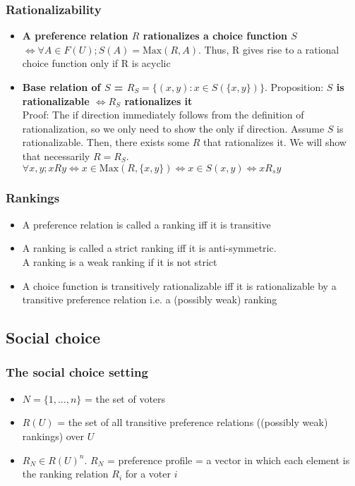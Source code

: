 \documentclass[20pt,a4paper,landscape]{extarticle}
\begin{document}
\begin{flushleft}
\subsubsection{Rationalizability}
\begin{itemize}
\item{\textbf{A preference relation $R$ rationalizes a choice function $S$ $\Leftrightarrow \forall A \in F(U); S(A) = \textrm{Max}(R, A)$}. Thus, R gives rise to a rational choice function only if R is acyclic}
\item{\textbf{Base relation of $S$ = $R_S = \{(x, y): x \in S(\{x, y\})\}$}. Proposition: \textbf{$S$ is rationalizable $\Leftrightarrow R_S$ rationalizes it}\\
Proof: The if direction immediately follows from the definition of rationalization, so we only need to show the only if direction. Assume $S$ is rationalizable. Then, there exists some $R$ that rationalizes it. We will show that necessarily $R = R_S$. $\forall x, y; xRy \Leftrightarrow x \in \textrm{Max}(R, \{x, y\}) \Leftrightarrow x \in S({x, y}) \Leftrightarrow xR_sy$}
\end{itemize}
\clearpage
\subsubsection{Rankings}
\begin{itemize}
\item A preference relation is called a ranking iff it is transitive
\item A ranking is called a strict ranking iff it is anti-symmetric.\\
A ranking is a weak ranking if it is not strict
\item A choice function is transitively rationalizable iff it is rationalizable by a transitive preference relation i.e. a (possibly weak) ranking
\end{itemize}
\clearpage
\subsection{Social choice}
\subsubsection{The social choice setting}
\begin{itemize}
\item $N = \{1, ..., n\}$ = the set of voters
\item $R(U)$ = the set of all transitive preference relations ((possibly weak) rankings) over $U$
\item{$R_N \in R(U)^n$. $R_N$ = preference profile = a vector in which each element is the ranking relation $R_i$ for a voter $i$}
\end{itemize}
\clearpage

\end{flushleft}
\end{document}
